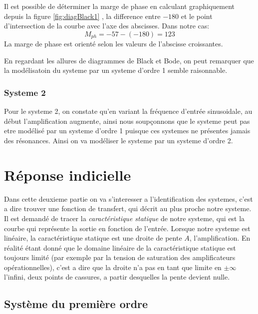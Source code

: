 \documentclass[12pt, a4paper]{report}
\begin{document}
Il est possible de déterminer la marge de phase en calculant graphiquement depuis la figure \ref{fig:diagBlack1}
, la difference entre 
$-180$ et le point d'intersection de la courbe avec l'axe des abscisses. Dans notre cas:
\[
    M_{ph} = -57 - (-180) = 123 
    \]
La marge de phase est orienté selon les valeurs de l'abscisse croissantes.\par 

En regardant les allures de diagrammes de Black et Bode, on peut remarquer que la modélisatoin du systeme par un systeme d'ordre
1 semble raisonnable.


\subsubsection{Systeme 2}

Pour le systeme 2, on constate qu'en variant la fréquence d'entrée sinusoidale, au début l'amplification augmente, ainsi
nous soupçonnons que le systeme peut pas etre modélisé par un systeme d'ordre 1 puisque ces systemes
ne présentes jamais des résonances. Ainsi on va modéliser le systeme par un systeme d'ordre 2.

\section{Réponse indicielle}

\par
Dans cette deuxieme partie on va s'interesser a l'identification des systemes, c'est a dire 
trouver une fonction de transfert, qui décrit au plus proche notre systeme. Il est demandé de tracer
la \textit{caractéristique statique} de notre systeme, qui est la courbe qui représente la sortie
en fonction de l'entrée. Lorsque notre systeme est linéaire, la caractéristique statique est
une droite de pente $A$, l'amplification. En réalité étant donné que le domaine linéaire de la caractéristique statique est
toujours limité (par exemple par la tension de saturation des amplificateurs opérationnelles), c'est a dire 
que la droite n'a pas en tant que limite en $\pm \infty$ l'infini, deux points de cassures, a partir desquelles
la pente devient nulle.

\subsection{Système du première ordre}
\end{document}
